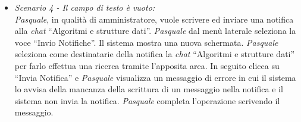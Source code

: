 \begin{itemize}
	\item \textit{Scenario 4 - Il campo di testo è vuoto:\\}
	\textit{Pasquale}, in qualità di amministratore, vuole scrivere ed inviare una notifica alla \textit{chat} “Algoritmi e strutture dati”. \textit{Pasquale} dal menù laterale seleziona la voce “Invio Notifiche”. Il sistema mostra una  nuova schermata. \textit{Pasquale} seleziona come destinatarie della notifica la \textit{chat} “Algoritmi e strutture dati” per farlo effettua una ricerca tramite l’apposita area.
	In seguito clicca su “Invia Notifica” e \textit{Pasquale} visualizza un messaggio di errore in cui il sistema lo avvisa della mancanza della scrittura di un messaggio nella notifica e il sistema non invia la notifica. \textit{Pasquale} completa l’operazione scrivendo il messaggio. 
\end{itemize}

